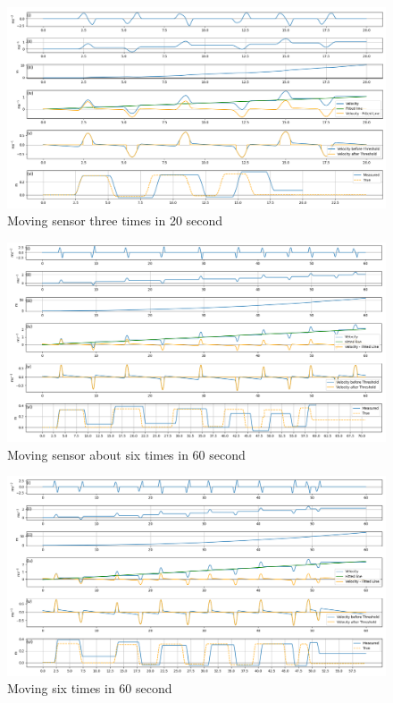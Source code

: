 \documentclass{article}
\begin{document}
\begin{figure}[hbt!]
  \includegraphics[width=\textwidth]{12.png}
  \caption{Moving sensor three times in 20 second}
\end{figure}

\begin{figure}[hbt!]
  \includegraphics[width=\textwidth]{16.png}
  \caption{Moving sensor about six times in 60 second}
\end{figure}

\begin{figure}[hbt!]
  \includegraphics[width=\textwidth]{17.png}
  \caption{Moving six times in 60 second}
\end{figure}
\end{document}
